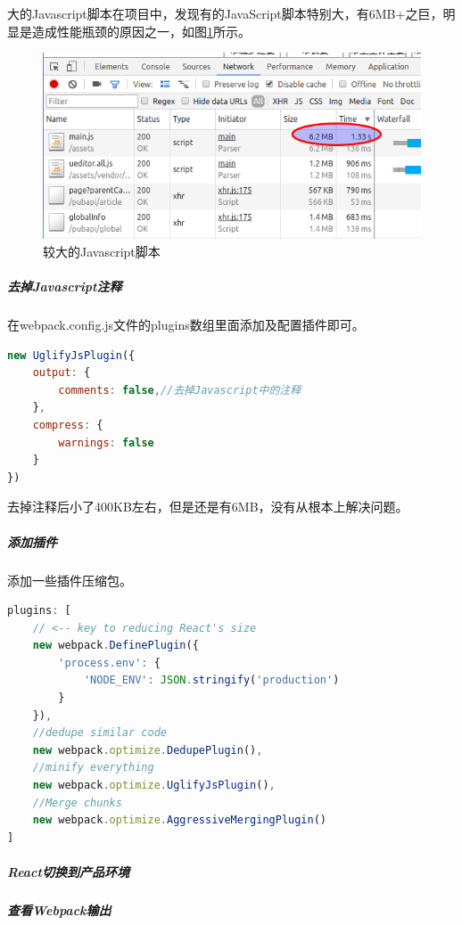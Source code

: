 \documentclass[12pt]{book}
\makeatletter
\numberwithin{dummy}{section}
\theoremstyle{ocrenumbox}
\theoremstyle{blacknumex}
\theoremstyle{blacknumbox}
\theoremstyle{ocrenum}
\renewcommand\paragraph{\@startsection{paragraph}{4}{\z@}
	{-2ex \@plus-.2ex \@minus .2ex}
	{.1ex}
	{\normalfont\small\sffamily\bfseries}}
\makeatother
\begin{document}
\paragraph{大的Javascript脚本}在项目中，发现有的JavaScript脚本特别大，有6MB+之巨，明显是造成性能瓶颈的原因之一，如图\ref{fig:largejavasript}所示。

\begin{figure}[htbp]
	\centering
	\includegraphics[scale=0.5]{largejavasript.png}
	\caption{较大的Javascript脚本}
	\label{fig:largejavasript}
\end{figure}

\subparagraph{去掉Javascript注释}

在webpack.config.js文件的plugins数组里面添加及配置插件即可。

\begin{lstlisting}[language=Javascript]
new UglifyJsPlugin({
	output: {
		comments: false,//去掉Javascript中的注释
	},
	compress: {
		warnings: false
	}
})
\end{lstlisting}

去掉注释后小了400KB左右，但是还是有6MB，没有从根本上解决问题。

\subparagraph{添加插件}

添加一些插件压缩包。

\begin{lstlisting}[language=Javascript]
plugins: [
	// <-- key to reducing React's size
	new webpack.DefinePlugin({ 
		'process.env': {
			'NODE_ENV': JSON.stringify('production')
		}
	}),
	//dedupe similar code
	new webpack.optimize.DedupePlugin(),
	//minify everything  
	new webpack.optimize.UglifyJsPlugin(), 
	//Merge chunks
	new webpack.optimize.AggressiveMergingPlugin() 
]
\end{lstlisting}


\subparagraph{React切换到产品环境}

\subparagraph{查看Webpack输出}
\end{document}
